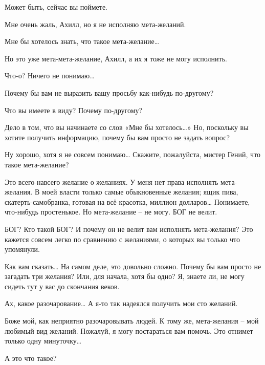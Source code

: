 \documentclass[../main.tex]{subfiles}
\begin{document}
\begin{Dialogue}
\begin{sublevel}
\begin{sublevel}
 Может быть, сейчас вы поймете.

 Мне очень жаль, Ахилл, но я не исполняю мета-желаний.

 Мне бы хотелось знать, что такое мета-желание\ldots{}

 Но это уже мета-мета-желание, Ахилл, а их я тоже не могу исполнить.

 Что-о? Ничего не понимаю\ldots{}

 Почему бы вам не выразить вашу просьбу как-нибудь по-другому?

 Что вы имеете в виду? Почему по-другому?

 Дело в том, что вы начинаете со слов «Мне бы хотелось\ldots» Но, поскольку вы хотите получить информацию, почему бы вам просто не задать вопрос?

 Ну хорошо, хотя я не совсем понимаю\ldots{} Скажите, пожалуйста, мистер Гений, что такое мета-желание?

 Это всего-навсего желание о желаниях. У меня нет права исполнять мета-желания. В моей власти только самые обыкновенные желания; ящик пива, скатерть-самобранка, готовая на всё красотка, миллион долларов\ldots{} Понимаете, что-нибудь простенькое. Но мета-желание \--- не могу. БОГ не велит.

 БОГ? Кто такой БОГ? И почему он не велит вам исполнять мета-желания? Это кажется совсем легко по сравнению с желаниями, о которых вы только что упомянули.

 Как вам сказать\ldots{} На самом деле, это довольно сложно. Почему бы вам просто не загадать три желания? Или, для начала, хотя бы одно? Я, знаете ли, не могу сидеть тут у вас до скончания веков.

 Ах, какое разочарование\ldots{} А я-то так надеялся получить мои сто желаний.

 Боже мой, как неприятно разочаровывать людей. К тому же, мета-желания \--- мой любимый вид желаний. Пожалуй, я могу постараться вам помочь. Это отнимет только одну минуточку\ldots{}


 А это что такое?


\end{sublevel}
\end{sublevel}
\end{Dialogue}
\end{document}
